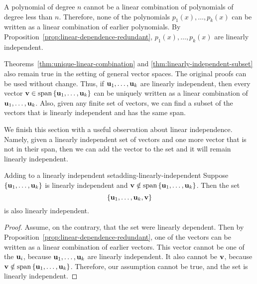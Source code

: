 \begin{solution}
  A polynomial of degree $n$ cannot be a linear combination of
  polynomials of degree less than $n$. Therefore, none of the
  polynomials $p_1(x), \ldots, p_k(x)$ can be written as a linear
  combination of earlier polynomials. By
  Proposition~\ref{prop:linear-dependence-redundant}, $p_1(x), \ldots,
  p_k(x)$ are linearly independent.
\end{solution}

Theorems~\ref{thm:unique-linear-combination} and
{\ref{thm:linearly-independent-subset}} also remain true in the
setting of general vector spaces. The original proofs can be used
without change. Thus, if $\mbox{\bf u}_1,\ldots,\mbox{\bf u}_k$ are linearly
independent, then every vector
$\vect{v}\in\sspan\set{\vect{u}_1,\ldots,\vect{u}_k}$ can be uniquely
written as a linear combination of
$\mbox{\bf u}_1,\ldots,\mbox{\bf u}_k$. Also, given any finite set of vectors,
we can find a subset of the vectors that is linearly independent and
has the same span.

We finish this section with a useful observation about linear
independence. Namely, given a linearly independent set of vectors and
one more vector that is not in their span, then we can add the vector
to the set and it will remain linearly independent. 

\begin{proposition}{Adding to a linearly independent set}{adding-linearly-independent}
  Suppose $\left\{\mbox{\bf u}_{1},\ldots,\mbox{\bf u}_{k}\right\}$ is linearly
  independent and
  $\vect{v}\notin \sspan\set{\vect{u}_{1},\ldots,\vect{u}_{k}}$. Then
  the set
  \begin{equation*}
    \left\{\mbox{\bf u}_{1},\ldots,\mbox{\bf u}_{k},\mbox{\bf v}\right\}
  \end{equation*}
  is also linearly independent.
\end{proposition}

\begin{proof}
  Assume, on the contrary, that the set were linearly dependent. Then
  by Proposition~\ref{prop:linear-dependence-redundant}, one of the
  vectors can be written as a linear combination of earlier vectors.
  This vector cannot be one of the $\mbox{\bf u}_i$, because
  $\mbox{\bf u}_{1},\ldots,\mbox{\bf u}_{k}$ are linearly independent.  It
  also cannot be $\mbox{\bf v}$, because
  $\vect{v}\notin
  \sspan\set{\vect{u}_{1},\ldots,\vect{u}_{k}}$. Therefore, our
  assumption cannot be true, and the set is linearly independent.
\end{proof}
